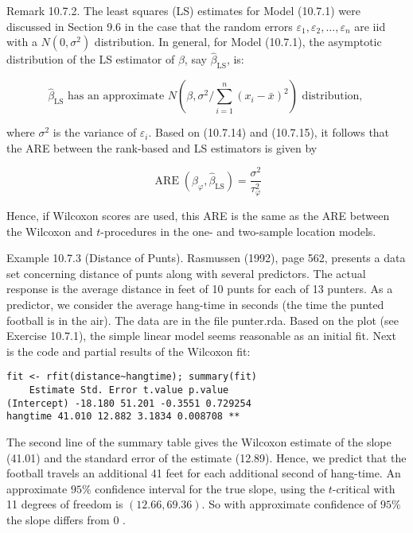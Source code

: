 Remark 10.7.2. The least squares (LS) estimates for Model (10.7.1) were discussed in Section 9.6 in the case that the random errors $\varepsilon_{1}, \varepsilon_{2}, \ldots, \varepsilon_{n}$ are iid with a $N\left(0, \sigma^{2}\right)$ distribution. In general, for Model (10.7.1), the asymptotic distribution of the LS estimator of $\beta$, say $\widehat{\beta}_{\mathrm{LS}}$, is:


\begin{equation*}
\widehat{\beta}_{\mathrm{LS}} \text { has an approximate } N\left(\beta, \sigma^{2} / \sum_{i=1}^{n}\left(x_{i}-\bar{x}\right)^{2}\right) \text { distribution, } \tag{10.7.15}
\end{equation*}


where $\sigma^{2}$ is the variance of $\varepsilon_{i}$. Based on (10.7.14) and (10.7.15), it follows that the ARE between the rank-based and LS estimators is given by


\begin{equation*}
\operatorname{ARE}\left(\widehat{\beta}_{\varphi}, \widehat{\beta}_{\mathrm{LS}}\right)=\frac{\sigma^{2}}{\tau_{\varphi}^{2}} \tag{10.7.16}
\end{equation*}


Hence, if Wilcoxon scores are used, this ARE is the same as the ARE between the Wilcoxon and $t$-procedures in the one- and two-sample location models.

Example 10.7.3 (Distance of Punts). Rasmussen (1992), page 562, presents a data set concerning distance of punts along with several predictors. The actual response is the average distance in feet of 10 punts for each of 13 punters. As a predictor, we consider the average hang-time in seconds (the time the punted football is in the air). The data are in the file punter.rda. Based on the plot (see Exercise 10.7.1), the simple linear model seems reasonable as an initial fit. Next is the code and partial results of the Wilcoxon fit:

\begin{verbatim}
fit <- rfit(distance~hangtime); summary(fit)
    Estimate Std. Error t.value p.value
(Intercept) -18.180 51.201 -0.3551 0.729254
hangtime 41.010 12.882 3.1834 0.008708 **
\end{verbatim}

The second line of the summary table gives the Wilcoxon estimate of the slope (41.01) and the standard error of the estimate (12.89). Hence, we predict that the football travels an additional 41 feet for each additional second of hang-time. An approximate $95 \%$ confidence interval for the true slope, using the $t$-critical with 11 degrees of freedom is $(12.66,69.36)$. So with approximate confidence of $95 \%$ the slope differs from 0 .

